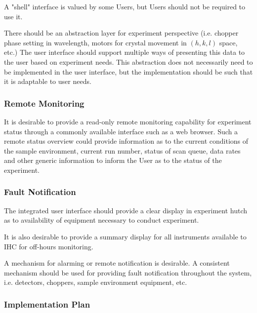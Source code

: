 A "shell" interface is valued by some Users, but Users should not be
required to use it.

There should be an abstraction layer for experiment perspective
(i.e. chopper phase setting in wavelength, motors for crystal movement
in $(h,k,l)$ space, etc.) The user interface should support multiple ways
of presenting this data to the user based on experiment needs. This
abstraction does not necessarily need to be implemented in the user
interface, but the implementation should be such that it is adaptable
to user needs.

\subsubsection{Remote Monitoring}

It is desirable to provide a read-only remote monitoring capability for
experiment status through a commonly available interface such as a web
browser. Such a remote status overview could provide information as to
the current conditions of the sample environment, current run number,
status of scan queue, data rates and other generic information to inform
the User as to the status of the experiment.


\subsubsection{Fault Notification}

The integrated user interface should provide a clear display in experiment
hutch as to availability of equipment necessary to conduct experiment.

It is also desirable to provide a summary display for all instruments
available to IHC for off-hours monitoring.

A mechanism for alarming or remote notification is desirable. A consistent
mechanism should be used for providing fault notification throughout
the system, i.e. detectors, choppers, sample environment equipment, etc.

\subsubsection{Implementation Plan}

